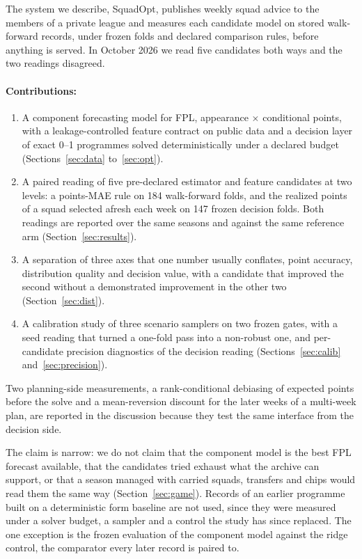 \documentclass[11pt,a4paper]{article}
\begin{document}
The system we describe, SquadOpt, publishes weekly squad advice to the members of a private league and measures each candidate model on stored walk-forward records, under frozen folds and declared comparison rules, before anything is served. In October 2026 we read five candidates both ways and the two readings disagreed.

\paragraph{Contributions:}
\begin{enumerate}
\item A component forecasting model for FPL, appearance $\times$ conditional points, with a leakage-controlled feature contract on public data and a decision layer of exact 0--1 programmes solved deterministically under a declared budget (Sections~\ref{sec:data} to~\ref{sec:opt}).
\item A paired reading of five pre-declared estimator and feature candidates at two levels: a points-MAE rule on 184 walk-forward folds, and the realized points of a squad selected afresh each week on 147 frozen decision folds. Both readings are reported over the same seasons and against the same reference arm (Section~\ref{sec:results}).
\item A separation of three axes that one number usually conflates, point accuracy, distribution quality and decision value, with a candidate that improved the second without a demonstrated improvement in the other two (Section~\ref{sec:dist}).
\item A calibration study of three scenario samplers on two frozen gates, with a seed reading that turned a one-fold pass into a non-robust one, and per-candidate precision diagnostics of the decision reading (Sections~\ref{sec:calib} and~\ref{sec:precision}).
\end{enumerate}

Two planning-side measurements, a rank-conditional debiasing of expected points before the solve and a mean-reversion discount for the later weeks of a multi-week plan, are reported in the discussion because they test the same interface from the decision side.

The claim is narrow: we do not claim that the component model is the best FPL forecast available, that the candidates tried exhaust what the archive can support, or that a season managed with carried squads, transfers and chips would read them the same way (Section~\ref{sec:game}). Records of an earlier programme built on a deterministic form baseline are not used, since they were measured under a solver budget, a sampler and a control the study has since replaced. The one exception is the frozen evaluation of the component model against the ridge control, the comparator every later record is paired to.
\end{document}
